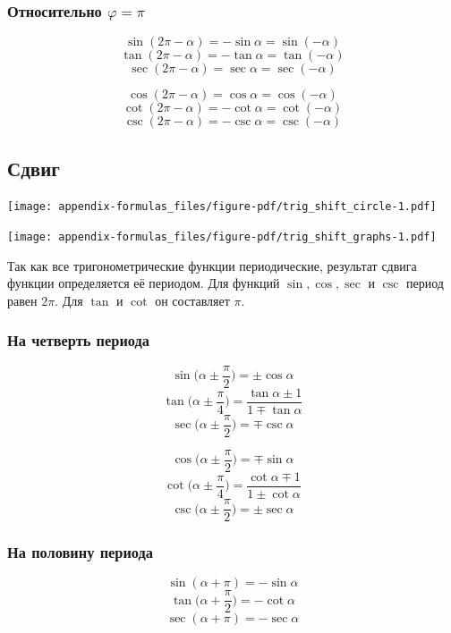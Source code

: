 \documentclass[
  letterpaper,
  DIV=11,
  numbers=noendperiod]{scrreprt}
\theoremstyle{definition}
\theoremstyle{remark}
\begin{document}
\subsubsection{\texorpdfstring{Относительно
\(\varphi = \pi\)}{Относительно \textbackslash varphi = \textbackslash pi}}\label{trig_reflections_pi}

\[\sin (2\pi - \alpha) = -\sin \alpha = \sin (-\alpha)\]
\[\tan (2\pi - \alpha) = -\tan \alpha = \tan (-\alpha)\]
\[\sec (2\pi - \alpha) = \sec \alpha = \sec (-\alpha)\]

\[\cos (2\pi - \alpha) = \cos \alpha = \cos (-\alpha)\]
\[\cot (2\pi - \alpha) = -\cot \alpha = \cot (-\alpha)\]
\[\csc (2\pi - \alpha) = -\csc \alpha = \csc (-\alpha)\]

\subsection{Сдвиг}\label{trig_shift}

\texttt{[image: appendix-formulas\_files/figure-pdf/trig\_shift\_circle-1.pdf]}

\texttt{[image: appendix-formulas\_files/figure-pdf/trig\_shift\_graphs-1.pdf]}

Так как все тригонометрические функции периодические, результат сдвига
функции определяется её периодом. Для функций \(\sin, \cos, \sec\) и
\(\csc\) период равен \(2\pi\). Для \(\tan\) и \(\cot\) он составляет
\(\pi\).

\subsubsection{На четверть периода}\label{trig_shift_by_one_quarter}

\[\sin \Big(\alpha \pm \frac{\pi}{2}\Big) = \pm\cos \alpha\]
\[\tan \Big(\alpha \pm \frac{\pi}{4}\Big) = \frac{\tan \alpha \pm 1}{1 \mp \tan \alpha}\]
\[\sec \Big(\alpha \pm \frac{\pi}{2}\Big) = \mp \csc \alpha\]

\[\cos \Big(\alpha \pm \frac{\pi}{2}\Big) = \mp \sin \alpha\]
\[\cot \Big(\alpha \pm \frac{\pi}{4}\Big) = \frac{\cot \alpha \mp 1}{1 \pm \cot \alpha}\]
\[\csc \Big(\alpha \pm \frac{\pi}{2}\Big) = \pm \sec \alpha\]

\subsubsection{На половину периода}\label{trig_shift_by_half}

\[\sin (\alpha + \pi) = -\sin \alpha\]
\[\tan \Big(\alpha + \frac{\pi}{2}\Big) = -\cot \alpha\]
\[\sec (\alpha + \pi) = -\sec \alpha\]
\end{document}
